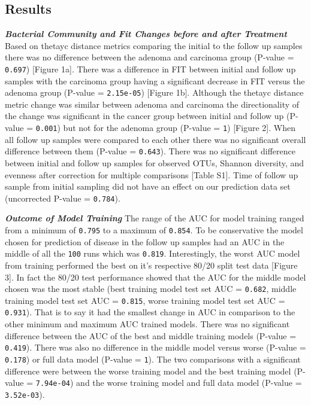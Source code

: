 \documentclass[12pt,]{article}
\begin{document}
\newpage

\subsection{Results}\label{results}

\textbf{\emph{Bacterial Community and Fit Changes before and after
Treatment}} Based on thetayc distance metrics comparing the initial to
the follow up samples there was no difference between the adenoma and
carcinoma group (P-value = \texttt{0.697}) {[}Figure 1a{]}. There was a
difference in FIT between initial and follow up samples with the
carcinoma group having a significant decrease in FIT versus the adenoma
group (P-value = \texttt{2.15e-05}) {[}Figure 1b{]}. Although the
thetayc distance metric change was similar between adenoma and carcinoma
the directionality of the change was significant in the cancer group
between initial and follow up (P-value = \texttt{0.001}) but not for the
adenoma group (P-value = \texttt{1}) {[}Figure 2{]}. When all follow up
samples were compared to each other there was no significant overall
difference between them (P-value = \texttt{0.643}). There was no
significant difference between initial and follow up samples for
observed OTUs, Shannon diversity, and evenness after correction for
multiple comparisons {[}Table S1{]}. Time of follow up sample from
initial sampling did not have an effect on our prediction data set
(uncorrected P-value = \texttt{0.784}).

\textbf{\emph{Outcome of Model Training}} The range of the AUC for model
training ranged from a minimum of \texttt{0.795} to a maximum of
\texttt{0.854}. To be conservative the model chosen for prediction of
disease in the follow up samples had an AUC in the middle of all the
\texttt{100} runs which was \texttt{0.819}. Interestingly, the worst AUC
model from training performed the best on it's respective 80/20 split
test data {[}Figure 3{]}. In fact the 80/20 test performance showed that
the AUC for the middle model chosen was the most stable (best training
model test set AUC = \texttt{0.682}, middle training model test set AUC
= \texttt{0.815}, worse training model test set AUC = \texttt{0.931}).
That is to say it had the smallest change in AUC in comparison to the
other minimum and maximum AUC trained models. There was no significant
difference between the AUC of the best and middle training models
(P-value = \texttt{0.419}). There was also no difference in the middle
model versus worse (P-value = \texttt{0.178}) or full data model
(P-value = \texttt{1}). The two comparisons with a significant
difference were between the worse training model and the best training
model (P-value = \texttt{7.94e-04}) and the worse training model and
full data model (P-value = \texttt{3.52e-03}).
\end{document}
